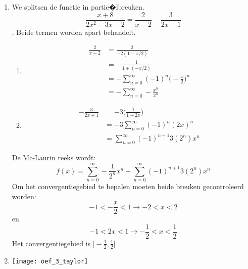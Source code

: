 {\begin{enumerate}
            $$\begin{cases}
               x = 1 \rightarrow \sum_{n = 0}^{\infty} - \frac{1}{n + 1} \rightarrow \hbox{div nr } -\infty \\
               x = -1, \rightarrow \sum_{n = 0}^{\infty}  - \frac{1}{n + 1}(-1)^{n + 1} = \sum_{n = 0}^{\infty} \frac{(-1)^{n}}{n + 1} \rightarrow \hbox{conv}
              \end{cases}
            $$
            Het convergentiegebied wordt $[-1, 1[$.
            \item We splitsen de functie in partie�lbreuken.
                    $$\frac{x + 8}{2x^2 - 3x - 2} = \frac{2}{x - 2} - \frac{3}{2x + 1}$$. Beide termen worden apart behandelt.
                \begin{enumerate}
                    \item   \begin{equation*}
                                \begin{split}
                                    \frac{2}{x - 2} & = \frac{2}{-2(1 - x/2)} \\
                                                    & = -\frac{1}{1 + (-x/2)} \\
                                                    & = - \sum_{n = 0}^{\infty} (-1)^n \bigg(-\frac{x}{2}\bigg)^n \\
                                                    & = - \sum_{n = 0}^{\infty} -\frac{x^n}{2^n}
                                \end{split}
                            \end{equation*}
                    \item \begin{equation*}
                                \begin{split}
                                    -\frac{3}{2x + 1} & = -3\bigg(\frac{1}{1 + 2x}\bigg) \\
                                                    & = -3\sum_{n = 0}^{\infty} (-1)^n(2x)^n \\
                                                    & = \sum_{n = 0}^\infty (-1)^{n + 1} 3(2^n)x^n
                                \end{split}
                            \end{equation*}
                \end{enumerate}
                De Mc-Laurin reeks wordt:
                $$f(x) = \sum_{n = 0}^{\infty} -\frac{1}{2^n}x^n + \sum_{n = 0}^\infty (-1)^{n + 1}3(2^n)x^n$$
                Om het convergentiegebied te bepalen moeten beide breuken gecontroleerd worden:
                $$-1 < -\frac{x}{2} < 1 \rightarrow -2 < x < 2$$
                en
                $$-1 < 2x < 1 \rightarrow -\frac{1}{2} < x < \frac{1}{2}$$
                Het convergentiegebied is $]-\frac{1}{2}, \frac{1}{2}[$
            \item \texttt{[image: oef\_3\_taylor]}
		\end{enumerate}
	}

